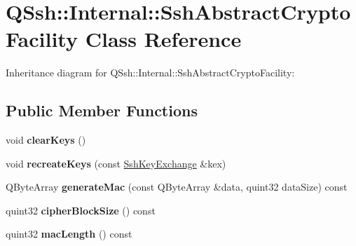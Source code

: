\hypertarget{class_q_ssh_1_1_internal_1_1_ssh_abstract_crypto_facility}{}\section{Q\+Ssh\+:\+:Internal\+:\+:Ssh\+Abstract\+Crypto\+Facility Class Reference}
\label{class_q_ssh_1_1_internal_1_1_ssh_abstract_crypto_facility}


Inheritance diagram for Q\+Ssh\+:\+:Internal\+:\+:Ssh\+Abstract\+Crypto\+Facility\+:
\subsection*{Public Member Functions}
\begin{DoxyCompactItemize}
\item 
\mbox{\label{class_q_ssh_1_1_internal_1_1_ssh_abstract_crypto_facility_a1c508dae5a53b8eaaeb8ff121bceac74}} 
void {\bfseries clear\+Keys} ()
\item 
\mbox{\label{class_q_ssh_1_1_internal_1_1_ssh_abstract_crypto_facility_abb072fc99e61085479476a0962a1a8d5}} 
void {\bfseries recreate\+Keys} (const \mbox{\hyperlink{class_q_ssh_1_1_internal_1_1_ssh_key_exchange}{Ssh\+Key\+Exchange}} \&kex)
\item 
\mbox{\label{class_q_ssh_1_1_internal_1_1_ssh_abstract_crypto_facility_af0a0cb3ce8f814c63ba038069126c226}} 
Q\+Byte\+Array {\bfseries generate\+Mac} (const Q\+Byte\+Array \&data, quint32 data\+Size) const
\item 
\mbox{\label{class_q_ssh_1_1_internal_1_1_ssh_abstract_crypto_facility_abfd88662cd0ae01854069fe798f9acb5}} 
quint32 {\bfseries cipher\+Block\+Size} () const
\item 
\mbox{\label{class_q_ssh_1_1_internal_1_1_ssh_abstract_crypto_facility_a9fc57b912f7d1edd095a1ee7f224eb5e}} 
quint32 {\bfseries mac\+Length} () const
\end{DoxyCompactItemize}
